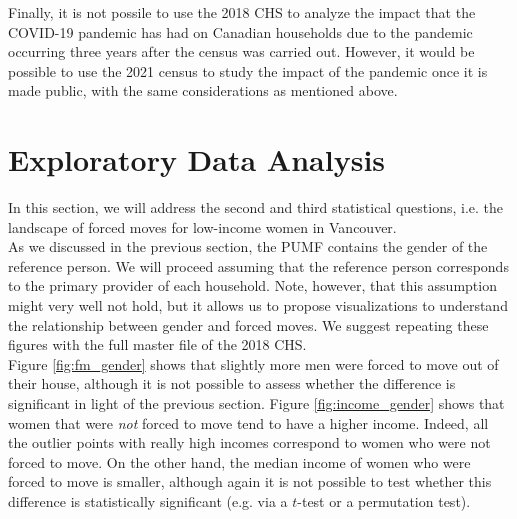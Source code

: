 \documentclass[11pt]{article}
\begin{document}
Finally, it is not possile to use the 2018 CHS to analyze the impact that
the COVID-19 pandemic has had on Canadian households due to the pandemic
occurring three years after the census was carried out. However, it would
be possible to use the 2021 census to study the impact of the pandemic
once it is made public, with the same considerations as mentioned above.




\section{Exploratory Data Analysis} \label{sec:eda}

In this section, we will address the second and third statistical
questions, i.e. the landscape of forced moves for low-income women
in Vancouver.
\\

As we discussed in the previous section, the PUMF contains the gender
of the reference person. We will proceed assuming that the reference
person corresponds to the primary provider of each household.
Note, however, that this assumption might very well not hold, but it
allows us to propose visualizations to understand the relationship
between gender and forced moves. We suggest repeating these figures
with the full master file of the 2018 CHS.
\\


Figure \ref{fig:fm_gender} shows that slightly more men were forced to move
out of their house, although it is not possible to assess whether the
difference is significant in light of the previous section.
Figure \ref{fig:income_gender} shows that women that were \textit{not}
forced to move tend to have a higher income. Indeed, all the outlier points
with really high incomes correspond to women who were not forced to move.
On the other hand, the median income of women who were forced to move
is smaller, although again it is not possible to test whether this
difference is statistically significant (e.g. via a $t$-test or a
permutation test).
\end{document}
